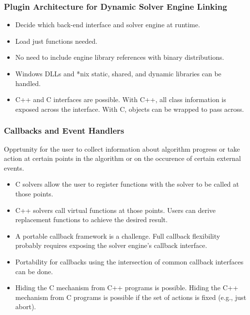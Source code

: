 \documentclass{beamer}
\begin{document}
\begin{frame}
  \frametitle{Plugin Architecture for Dynamic Solver Engine Linking}
  \begin{itemize}
  \item Decide which back-end interface and solver engine at runtime.
  \item Load just functions needed.
  \item No need to include engine library references with binary
    distributions.
  \item Windows DLLs and *nix static, shared, and dynamic libraries
    can be handled.
  \item C++ and C interfaces are possible.  With C++, all class
    information is exposed across the interface.  With C, objects
    can be wrapped to pass across.
  \end{itemize}
\end{frame}

\begin{frame}
  \frametitle{Callbacks and Event Handlers}

  Opprtunity for the user to collect information about algorithm
  progress or take action at certain points in the algorithm or on
  the occurence of certain external events.
  \begin{itemize}
  \item C solvers allow the user to register functions with the
    solver to be called at those points.
  \item C++ solvers call virtual functions at those points.  Users
    can derive replacement functions to achieve the desired result.
  \item A portable callback framework is a challenge.  Full callback
    flexibility probably requires exposing the solver engine's
    callback interface.
  \item Portability for callbacks using the intersection of common
    callback interfaces can be done.
  \item Hiding the C mechanism from C++ programs is possible.
    Hiding the C++ mechanism from C programs is possible if the set
    of actions is fixed (e.g., just abort).
  \end{itemize}
\end{frame}
\end{document}
